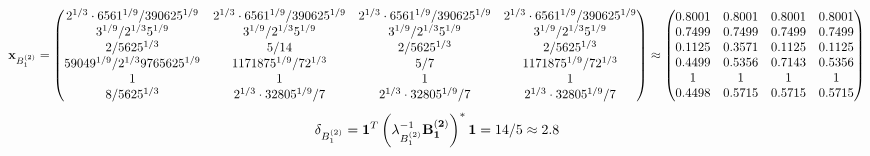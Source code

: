 \documentclass[10pt,a4paper]{article}
\begin{document}
	\[
		\bold{x}_{B_1^{(2)}} = 
		\begin{pmatrix}
			{{2^ {1 / 3}} \cdot {6561^ {1 / 9}}} / {{390625^ {1 / 9}}} & {{2^ {1 / 3}} \cdot {6561^ {1 / 9}}} / {{390625^ {1 / 9}}} & {{2^ {1 / 3}} \cdot {6561^ {1 / 9}}} / {{390625^ {1 / 9}}} & {{2^ {1 / 3}} \cdot {6561^ {1 / 9}}} / {{390625^ {1 / 9}}} \\
			{{3^ {1 / 9}}} / {{2^ {1 / 3}}{5^ {1 / 9}}} & {{3^ {1 / 9}}} / {{2^ {1 / 3}}{5^ {1 / 9}}} & {{3^ {1 / 9}}} / {{2^ {1 / 3}}{5^ {1 / 9}}} & {{3^ {1 / 9}}} / {{2^ {1 / 3}}{5^ {1 / 9}}} \\
			{{2}} / {{5625^ {1 / 3}}} & {{5}} / {{14}} & {{2}} / {{5625^ {1 / 3}}} & {{2}} / {{5625^ {1 / 3}}} \\
			{{59049^ {1 / 9}}} / {{2^ {1 / 3}}{9765625^ {1 / 9}}} & {{1171875^ {1 / 9}}} / {{7}{2^ {1 / 3}}} & {{5}} / {{7}} & {{1171875^ {1 / 9}}} / {{7}{2^ {1 / 3}}} \\
			{1}{} & {1}{} & {1}{} & {1}{} \\
			{{8}} / {{5625^ {1 / 3}}} & {{2^ {1 / 3}} \cdot {32805^ {1 / 9}}} / {{7}} & {{2^ {1 / 3}} \cdot {32805^ {1 / 9}}} / {{7}} & {{2^ {1 / 3}} \cdot {32805^ {1 / 9}}} / {{7}} \\
		\end{pmatrix}
		\approx
		\begin{pmatrix}
			0.8001   & 0.8001   & 0.8001   & 0.8001   \\
			0.7499   & 0.7499   & 0.7499   & 0.7499   \\
			0.1125   & 0.3571   & 0.1125   & 0.1125   \\
			0.4499   & 0.5356   & 0.7143   & 0.5356   \\
			1        & 1        & 1        & 1        \\
			0.4498   & 0.5715   & 0.5715   & 0.5715   \\
		\end{pmatrix}
	\]
	\[
		\delta_{B_1^{(2)}} = \bold{1}^T \left(\lambda_{B_1^{(2)}}^{-1}\bold{B_1^{(2)}}\right)^* \bold{1} = {{14}} / {{5}}\approx 2.8
	\]
\end{document}
